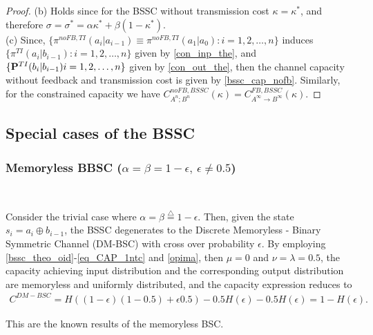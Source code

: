 \documentclass[11pt, a4paper, journal,onecolumn]{IEEEtran}
\newcommand{\sr}{\stackrel}
\newcommand{\rar}{\rightarrow}
\newcommand{\tri}{\sr{\triangle}{=}}
\newcommand{\bea}{\begin{eqnarray}}
\newcommand{\eea}{\end{eqnarray}}
\begin{document}
\begin{proof}
(b) Holds since for  the BSSC  without transmission cost $\kappa=\kappa^*$, and therefore $\sigma=\sigma^*={\alpha}{\kappa^*}+{\beta}({1-\kappa^*})$.\\
{(c)} Since, $\{{\pi}^{noFB,TI}(a_i|a_{i-1})\equiv {\pi}^{noFB,TI}(a_1|a_{0}):i=1,2,\ldots,n \}$ induces  $\{{\pi}^{TI}(a_i|b_{i-1}):i=1,2,\ldots,n \}$ given by \eqref{con_inp_the}, and  $\{{\bf P}^{TI}(b_i|b_{i-1})i=1,2,\ldots,n \}$ given by \eqref{con_out_the}, then the channel capacity without feedback and transmission cost is given by \eqref{bssc_cap_nofb}. Similarly, for the constrained capacity we have $C_{A^n; B^n}^{noFB,BSSC}(\kappa)= C^{FB, BSSC}_{A^\infty \rar B^\infty}(\kappa)$.
\end{proof}


\subsection{Special cases of the BSSC}
\subsubsection{ Memoryless BBSC (${\alpha}={\beta}=1-\epsilon, \ \epsilon\neq 0.5$)} \ 
\par Consider the trivial case where ${\alpha}={\beta} \tri 1-\epsilon$. Then, given the state $s_i=a_i\oplus b_{i-1}$, the BSSC degenerates to the Discrete Memoryless - Binary Symmetric Channel (DM-BSC) with cross
over probability $\epsilon$. By employing \eqref{bssc_theo_oid}-\eqref{eq_CAP_1ntc} and \eqref{opima}, then  $\mu=0$ and $ \nu=\lambda=0.5$, the capacity achieving input distribution and the corresponding output distribution are memoryless and uniformly distributed, and the  capacity expression reduces to 
\bea
C^{DM-BSC}=H((1-\epsilon)(1-{0.5})+\epsilon{0.5})-{0.5}H(\epsilon)-{0.5}H(\epsilon)
=1-H(\epsilon) . \nonumber
\eea
\par This are the known results of the memoryless BSC.
\end{document}
